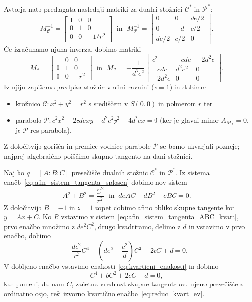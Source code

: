 Avtorja nato predlagata naslednji matriki za dualni stožnici $\mathcal{C^*}$ in $\mathcal{P^*}$:
$$ M^{-1}_\mathcal{C} =
    \begin{bmatrix}
        1 & 0 & 0\\
        0 & 1 & 0\\
        0 & 0 & -1/r^2
    \end{bmatrix}
\; \text{ in } \; M^{-1}_\mathcal{P} =
    \begin{bmatrix}
        0 & 0 & de/2\\
        0 & -d & c/2\\
        de/2 & c/2 & 0
    \end{bmatrix}.
$$
Če izračunamo njuna inverza, dobimo matriki
$$ M_\mathcal{C} =
    \begin{bmatrix}
        1 & 0 & 0\\
        0 & 1 & 0\\
        0 & 0 & -r^2
    \end{bmatrix}
    \; \text{ in } \; M_\mathcal{P} = -\frac{1}{d^3e^2}
    \begin{bmatrix}
        c^2 & -cde & -2d^2e\\
        -cde & d^2e^2 & 0\\
        -2d^2e & 0 & 0
    \end{bmatrix}.
$$
Iz njiju zapišemo predpisa stožnic v afini ravnini ($z = 1$) in dobimo:
\begin{itemize}
    \item krožnico $\mathcal{C}: x^2 + y^2 = r^2$ s središčem v $S(0,0)$ in polmerom $r$ ter
    \item parabolo $\mathcal{P}: c^2x^2 - 2cdexy + d^2e^2y^2 - 4d^2ex = 0$ (ker je glavni minor $A_{M_\mathcal{P}} = 0$, je $\mathcal{P}$ res parabola).
\end{itemize}
Z določitvijo gorišča in premice vodnice parabole $\mathcal{P}$ se bomo ukvarjali pozneje; najprej algebraično poiščimo skupno tangento na dani stožnici.

Naj bo $q = [A : B : C]$ presečišče dualnih stožnic $\mathcal{C^*}$ in $\mathcal{P^*}$. Iz sistema enačb~\eqref{eq:afin_sistem_tangenta_splosen} dobimo nov sistem
\begin{equation}
    \label{eq:afin_sistem_tangenta_ABC_kvart}
    A^2 + B^2 = \frac{C^2}{r^2} \; \text{ in } \; deAC - dB^2 + cBC = 0.
\end{equation}
Z določitvijo $B = -1$ in $z = 1$ zopet dobimo afino obliko skupne tangente kot $y = Ax + C$. Ko $B$ vstavimo v sistem~\eqref{eq:afin_sistem_tangenta_ABC_kvart}, prvo enačbo množimo z $de^2C^2$, drugo kvadriramo, delimo z $d$ in vstavimo v prvo enačbo, dobimo
$$ - \frac{de^2}{r^2}C^4 - (de^2 + \frac{c^2}{d})C^2 + 2cC + d = 0.$$
V dobljeno enačbo vstavimo enakosti~\eqref{eq:kvarticni_enakosti} in dobimo
$$C^4 + bC^2 + 2cC + d = 0,$$
kar pomeni, da nam $C$, začetna vrednost skupne tangente oz.\ njeno presečišče z ordinatno osjo, reši izvorno kvartično enačbo~\eqref{eq:reduc_kvart_ev}.

